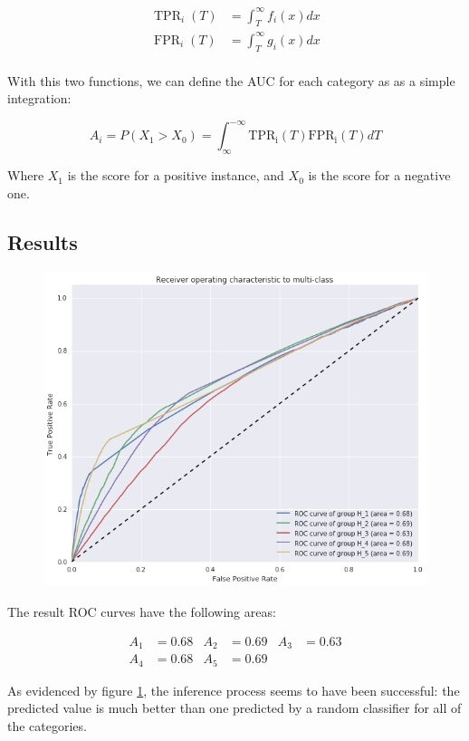 \vspace{-1em}

\begin{align*}
\operatorname{TPR}_i(T) &= \int^{\infty}_T f_i(x) dx \\
\operatorname{FPR}_i(T) &= \int^{\infty}_T g_i(x) dx \\
\end{align*}

\vspace{-1.5em}

With this two functions, we can define the AUC for each category as as a simple integration:

\[
A_i = P(X_1 > X_0) = \int^{-\infty}_{\infty} \operatorname{TPR_i}(T) \operatorname{FPR_i}(T) dT
\]

Where $ X_1 $ is the score for a positive instance, and $ X_0 $ is the score for a negative one.

\subsection{Results}

\begin{figure}[H]
\begin{center}
\includegraphics[width=\columnwidth]{figures/ROC_multiclass/ROC_multiclass.png}
\caption{ \protect}
\label{ROC_multiclass}
\end{center}
\end{figure}

The result ROC curves have the following areas:

\begin{align*}
A_1 &= 0.68 & A_2 &= 0.69 & A_3 &= 0.63 \\ 
A_4 &= 0.68 & A_5 &= 0.69
\end{align*}

As evidenced by figure \ref{ROC_multiclass}, the inference process seems to have been successful: the predicted value is much better than one predicted by a random classifier for all of the categories.
